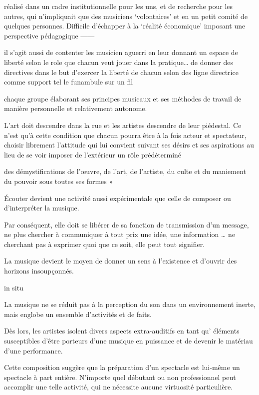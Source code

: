 réalisé dans un cadre institutionnelle pour les uns, et de recherche pour les autres, qui n’impliquait que des musiciens `volontaires’ et en un petit comité de quelques personnes. Difficile d’échapper à la `réalité économique’ imposant une perspective pédagogique
——

il s’agit aussi de contenter les musicien aguerri  en leur donnant un espace de liberté selon le role que chacun veut jouer dans la pratique…
de donner des directives dans le but d’exercer la liberté de chacun selon des ligne directrice comme support tel le funambule sur un fil 

chaque groupe élaborant ses principes musicaux et ses méthodes de travail de manière personnelle et relativement autonome.

L'art doit descendre dans la rue et les artistes descendre de leur piédestal. Ce n’est qu’à cette condition que chacun pourra être à la fois acteur et spectateur, choisir librement l’attitude qui lui convient suivant ses désirs et ses aspirations au lieu de se voir imposer de l’extérieur un rôle prédéterminé

des démystifications de l’œuvre, de l’art, de l’artiste, du culte et du maniement du pouvoir sous toutes ses formes »

Écouter devient une activité aussi expérimentale que celle de composer ou d'interpréter la musique. 

Par conséquent, elle doit se libérer de sa fonction de transmission d’un message, ne plus chercher à communiquer à tout prix une idée, une information
…
ne cherchant pas à exprimer quoi que ce soit, elle peut tout signifier.

La musique devient le moyen de donner un sens à l’existence et d'ouvrir des horizons insoupçonnés.





in situ

La musique ne se réduit pas à la perception du son dans un  environnement inerte, mais englobe un ensemble d'activités et de faits.

Dès lors, les artistes isolent divers aspects extra-auditifs en tant qu’ éléments susceptibles d’être porteurs d’une musique en puissance et de devenir le matériau  d'une performance. 


Cette composition suggère que la préparation d'un  spectacle est
lui-même un spectacle à part entière. N’importe quel débutant ou non professionnel peut accomplir une telle activité, qui ne nécessite aucune virtuosité particulière.

